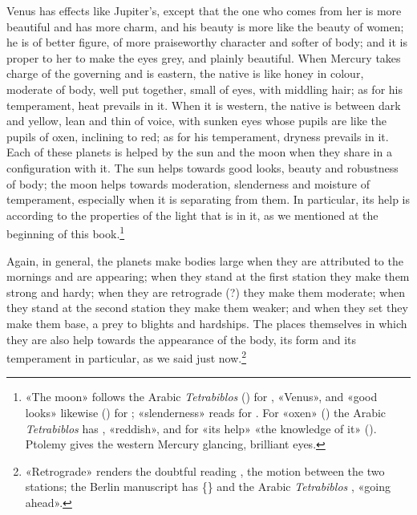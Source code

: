 \documentclass[11pt]{article}
\newcommand{\Fol}[1]{\marginpar{\footnotesize\color{gray}f.\,#1}}
\begin{document}
\par \Fol{51v}Venus has effects like Jupiter's, except that the one who comes from her is more beautiful and has more charm, and his beauty is more like the beauty of women; he is of better figure, of more praiseworthy character and softer of body; and it is proper to her to make the eyes grey, and plainly beautiful. When Mercury takes charge of the governing and is eastern, the native is like honey in colour, moderate of body, well put together, small of eyes, with middling hair; as for his temperament, heat prevails in it. When it is western, the native is between dark and yellow, lean and thin of voice, with sunken eyes whose pupils are like the pupils of oxen, inclining to red; as for his temperament, dryness prevails in it. Each of these planets is helped by the sun and the moon when they share in a configuration with it. The sun helps towards good looks, beauty and robustness of body; the moon helps towards moderation, slenderness and moisture of temperament, especially when it is separating from them. In particular, its help is according to the properties of the light that is in it, as we mentioned at the beginning of this book.\footnote{«The moon» follows the Arabic \emph{Tetrabiblos} () for , «Venus», and «good looks» likewise () for ; «slenderness» reads  for . For «oxen» () the Arabic \emph{Tetrabiblos} has , «reddish», and for «its help» «the knowledge of it» (). Ptolemy gives the western Mercury glancing, brilliant eyes.}\par
\par Again, in general, the planets make bodies large when they are attributed to the mornings and are appearing; when they stand at the first station they make them strong and hardy; when they are retrograde (?) they make them moderate; when they stand at the second station they make them weaker; and when they set they make them base, a prey to blights and hardships. The places themselves in which they are also help towards the appearance of the body, its form and its temperament in particular, as we said just now.\footnote{«Retrograde» renders the doubtful reading , the motion between the two stations; the Berlin manuscript has \{\} and the Arabic \emph{Tetrabiblos} , «going ahead».}\par
\end{document}
